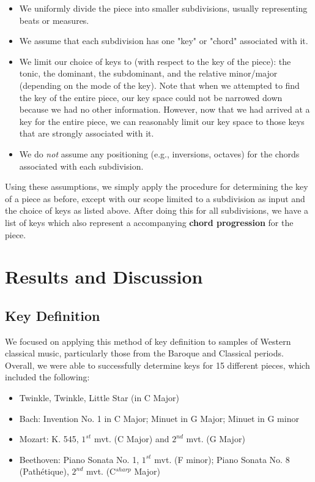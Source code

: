 \documentclass[11pt]{article}
\begin{document}
\begin{itemize}
\item We uniformly divide the piece into smaller subdivisions, usually representing beats or measures.
\item We assume that each subdivision has one "key" or "chord" associated with it.
\item We limit our choice of keys to (with respect to the key of the piece): the tonic, the dominant, the subdominant, and the relative minor/major (depending on the mode of the key). Note that when we attempted to find the key of the entire piece, our key space could not be narrowed down because we had no other information. However, now that we had arrived at a key for the entire piece, we can reasonably limit our key space to those keys that are strongly associated with it.
\item We do {\it not} assume any positioning (e.g., inversions, octaves) for the chords associated with each subdivision.
\end{itemize}

Using these assumptions, we simply apply the procedure for determining the key of a piece as before, except with our scope limited to a subdivision as input and the choice of keys as listed above. After doing this for all subdivisions, we have a list of keys which also represent a accompanying {\bf chord progression} for the piece.

\section{Results and Discussion}

\subsection{Key Definition}
We focused on applying this method of key definition to samples of Western classical music, particularly those from the Baroque and Classical periods. Overall, we were able to successfully determine keys for 15 different pieces, which included the following:
\begin{itemize}
\item Twinkle, Twinkle, Little Star (in C Major)
\item Bach: Invention No. 1 in C Major; Minuet in G Major; Minuet in G minor
\item Mozart: K. 545, $1^{st}$ mvt. (C Major) and $2^{nd}$ mvt. (G Major)
\item Beethoven: Piano Sonata No. 1, $1^{st}$ mvt. (F minor); Piano Sonata No. 8 (Path\'{e}tique), $2^{nd}$ mvt. (C$^{sharp}$ Major)
\end{itemize}
\end{document}
